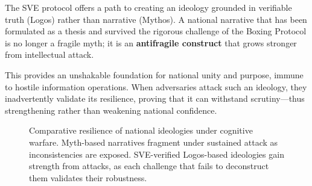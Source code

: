 \documentclass[11pt,a4paper]{article}
\begin{document}
\begin{small}
The SVE protocol offers a path to creating an ideology grounded in verifiable truth (Logos) rather than narrative (Mythos). A national narrative that has been formulated as a thesis and survived the rigorous challenge of the Boxing Protocol is no longer a fragile myth; it is an \textbf{antifragile construct} that grows stronger from intellectual attack.

This provides an unshakable foundation for national unity and purpose, immune to hostile information operations. When adversaries attack such an ideology, they inadvertently validate its resilience, proving that it can withstand scrutiny—thus strengthening rather than weakening national confidence.

\begin{figure}[h!]
\centering
{}
\caption{Comparative resilience of national ideologies under cognitive warfare. Myth-based narratives fragment under sustained attack as inconsistencies are exposed. SVE-verified Logos-based ideologies gain strength from attacks, as each challenge that fails to deconstruct them validates their robustness.}
\label{fig:ideology_resilience}
\end{figure}


\end{small}
\end{document}

